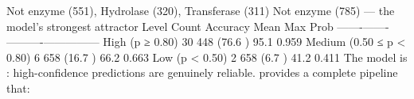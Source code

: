 {}\markdownRendererUlBeginTight
\markdownRendererUlItem {} Not enzyme (551), Hydrolase (320), Transferase (311)\markdownRendererUlItemEnd 
\markdownRendererUlItem {} Not enzyme (785) — the model's strongest attractor\markdownRendererUlItemEnd 
\markdownRendererUlEndTight \markdownRendererInterblockSeparator
{}\markdownRendererThematicBreak{}\markdownRendererInterblockSeparator
{}
\markdownRendererSectionEnd 
\markdownRendererSectionEnd \markdownRendererSectionBegin
{}\markdownRendererInterblockSeparator
{}\markdownRendererInterblockSeparator
{}\markdownRendererSectionBegin
{}\markdownRendererInterblockSeparator
{}\markdownRendererPipe{} Level \markdownRendererPipe{} Count \markdownRendererPipe{} Accuracy \markdownRendererPipe{} Mean Max Prob \markdownRendererPipe{}\markdownRendererSoftLineBreak
{}\markdownRendererPipe{}-------\markdownRendererPipe{}-------\markdownRendererPipe{}----------\markdownRendererPipe{}---------------\markdownRendererPipe{}\markdownRendererSoftLineBreak
{}\markdownRendererPipe{} High (p ≥ 0.80) \markdownRendererPipe{} 30 448 (76.6 \markdownRendererPercentSign{}) \markdownRendererPipe{} 95.1 \markdownRendererPercentSign{} \markdownRendererPipe{} 0.959 \markdownRendererPipe{}\markdownRendererSoftLineBreak
{}\markdownRendererPipe{} Medium (0.50 ≤ p < 0.80) \markdownRendererPipe{} 6 658 (16.7 \markdownRendererPercentSign{}) \markdownRendererPipe{} 66.2 \markdownRendererPercentSign{} \markdownRendererPipe{} 0.663 \markdownRendererPipe{}\markdownRendererSoftLineBreak
{}\markdownRendererPipe{} Low (p < 0.50) \markdownRendererPipe{} 2 658 (6.7 \markdownRendererPercentSign{}) \markdownRendererPipe{} 41.2 \markdownRendererPercentSign{} \markdownRendererPipe{} 0.411 \markdownRendererPipe{}\markdownRendererParagraphSeparator
{}The model is : high-confidence predictions are genuinely reliable.\markdownRendererInterblockSeparator
{}\markdownRendererThematicBreak{}\markdownRendererInterblockSeparator
{}
\markdownRendererSectionEnd 
\markdownRendererSectionEnd \markdownRendererSectionBegin
{}\markdownRendererInterblockSeparator
{} provides a complete pipeline that:\markdownRendererInterblockSeparator
